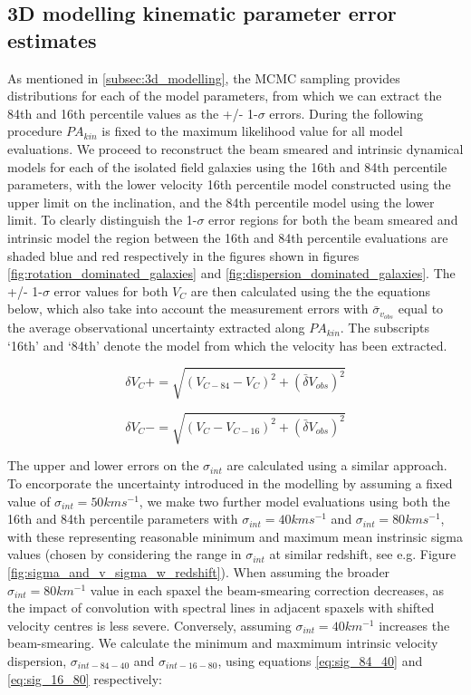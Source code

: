 \documentclass[fleqn,usenatbib]{mn2e}
\begin{document}
\subsection{3D modelling kinematic parameter error estimates}\label{appsubsec:model_errors}
As mentioned in \cref{subsec:3d_modelling}, the MCMC sampling provides distributions for each of the model parameters, from which we can extract the 84th and 16th percentile values as the +/- 1-$\sigma$ errors.
During the following procedure $PA_{kin}$ is fixed to the maximum likelihood value for all model evaluations.
We proceed to reconstruct the beam smeared and intrinsic dynamical models for each of the isolated field galaxies using the 16th and 84th percentile parameters, with the lower velocity 16th percentile model constructed using the upper limit on the inclination, and the 84th percentile model using the lower limit.
To clearly distinguish the 1-$\sigma$ error regions for both the beam smeared and intrinsic model the region between the 16th and 84th percentile evaluations are shaded blue and red respectively in the figures shown in figures \ref{fig:rotation_dominated_galaxies} and \ref{fig:dispersion_dominated_galaxies}.
The +/- 1-$\sigma$ error values for both $V_{C}$ are then calculated using the the equations below, which also take into account the measurement errors with $\bar{\sigma}_{v_{obs}}$ equal to the average observational uncertainty extracted along $PA_{kin}$.
The subscripts `16th' and `84th' denote the model from which the velocity has been extracted.


\begin{equation}\label{eq:VC_plus}
   \delta V_{C}+ = \sqrt{\left(V_{C-84} - V_{C}\right)^{2} + \left(\bar{\delta}V_{obs}\right)^{2}}
\end{equation}

\begin{equation}\label{eq:VC_minus}
   \delta V_{C}- = \sqrt{\left(V_{C} - V_{C-16}\right)^{2}  + \left(\bar{\delta}V_{obs}\right)^{2}}
\end{equation}

The upper and lower errors on the $\sigma_{int}$ are calculated using a similar approach.
To encorporate the uncertainty introduced in the modelling by assuming a fixed value of $\sigma_{int}=50kms^{-1}$, we make two further model evaluations using both the 16th and 84th percentile parameters with $\sigma_{int} = 40kms^{-1}$ and $\sigma_{int} = 80kms^{-1}$, with these representing reasonable minimum and maximum mean instrinsic sigma values (chosen by considering the range in $\sigma_{int}$ at similar redshift, see e.g. Figure \ref{fig:sigma_and_v_sigma_w_redshift}).
When assuming the broader $\sigma_{int} = 80km^{-1}$ value in each spaxel the beam-smearing correction decreases, as the impact of convolution with spectral lines in adjacent spaxels with shifted velocity centres is less severe.
Conversely, assuming $\sigma_{int} = 40km^{-1}$ increases the beam-smearing.
We calculate the minimum and maxmimum intrinsic velocity dispersion, $\sigma_{int-84-40}$ and $\sigma_{int-16-80}$, using equations \ref{eq:sig_84_40} and \ref{eq:sig_16_80} respectively:
\end{document}
